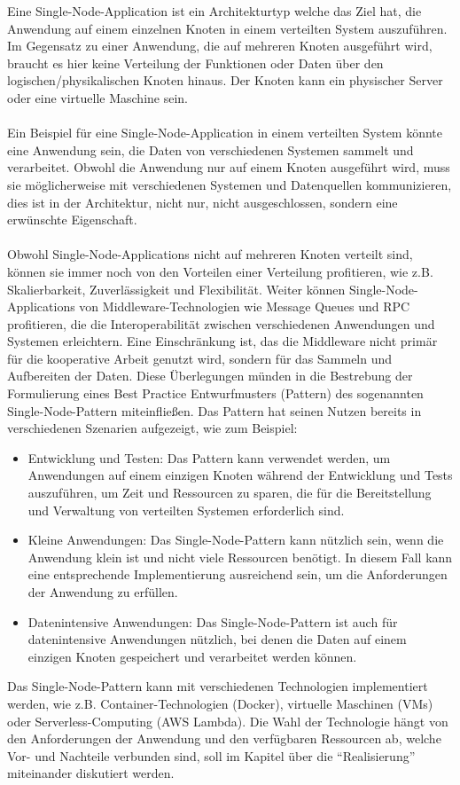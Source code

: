 \documentclass[../vs-script-first-v01.tex]{subfiles}
\begin{document}
Eine Single-Node-Application ist ein Architekturtyp welche das Ziel hat, die Anwendung auf einem einzelnen Knoten in einem verteilten System auszuführen. Im Gegensatz zu einer Anwendung, die auf mehreren Knoten ausgeführt wird, braucht es hier keine Verteilung der Funktionen oder Daten über den logischen/physikalischen Knoten hinaus. Der Knoten kann ein physischer Server oder eine virtuelle Maschine sein.
\\\\
Ein Beispiel für eine Single-Node-Application in einem verteilten System könnte eine Anwendung sein, die Daten von verschiedenen Systemen sammelt und verarbeitet. Obwohl die Anwendung nur auf einem Knoten ausgeführt wird, muss sie möglicherweise mit verschiedenen Systemen und Datenquellen kommunizieren, dies ist in der Architektur, nicht nur, nicht ausgeschlossen, sondern eine erwünschte Eigenschaft.
\\\\
Obwohl Single-Node-Applications nicht auf mehreren Knoten verteilt sind, können sie immer noch von den Vorteilen einer Verteilung profitieren, wie z.B. Skalierbarkeit, Zuverlässigkeit und Flexibilität. Weiter können
Single-Node-Applications von Middleware-Technologien wie Message Queues und RPC profitieren, die die Interoperabilität zwischen verschiedenen Anwendungen und Systemen erleichtern. Eine Einschränkung ist, das die Middleware nicht primär für die kooperative Arbeit genutzt wird, sondern für das Sammeln und Aufbereiten der Daten. Diese Überlegungen münden in die Bestrebung der Formulierung eines Best Practice Entwurfmusters (Pattern) des sogenannten Single-Node-Pattern miteinfließen. Das Pattern hat seinen Nutzen bereits in verschiedenen Szenarien aufgezeigt, wie zum Beispiel:
\begin{itemize}
\item Entwicklung und Testen: Das Pattern kann verwendet werden, um Anwendungen auf einem einzigen Knoten während der Entwicklung und Tests auszuführen, um Zeit und Ressourcen zu sparen, die für die Bereitstellung und Verwaltung von verteilten Systemen erforderlich sind.
\item Kleine Anwendungen: Das Single-Node-Pattern kann nützlich sein, wenn die Anwendung klein ist und nicht viele Ressourcen benötigt. In diesem Fall kann eine entsprechende Implementierung ausreichend sein, um die Anforderungen der Anwendung zu erfüllen.
\item Datenintensive Anwendungen: Das Single-Node-Pattern ist auch für datenintensive Anwendungen nützlich, bei denen die Daten auf einem einzigen Knoten gespeichert und verarbeitet werden können.
\end{itemize}
Das Single-Node-Pattern kann mit verschiedenen Technologien implementiert werden, wie z.B. Container-Technologien (Docker), virtuelle Maschinen (VMs) oder Serverless-Computing (AWS Lambda). Die Wahl der Technologie hängt von den Anforderungen der Anwendung und den verfügbaren Ressourcen ab, welche Vor- und Nachteile verbunden sind, soll im Kapitel über die \enquote{Realisierung} miteinander diskutiert werden. 
\end{document}
